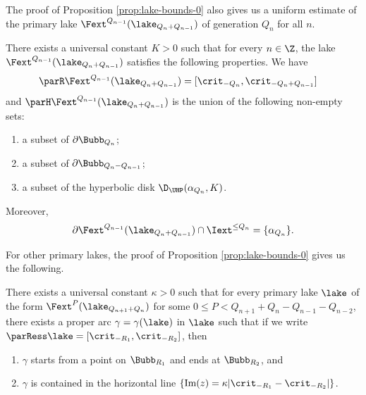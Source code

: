 \documentclass{amsart}
\begin{document}
The proof of Proposition \ref{prop:lake-bounds-0} also gives us a uniform estimate of the primary lake $\Fext^{Q_{n-1}}(\lake_{Q_n+Q_{n-1}})$ of generation $Q_n$ for all $n$.

\begin{proposition}
\label{prop:lake-bounds-1}
    There exists a universal constant $K > 0$ such that for every $n \in \Z$,
    the lake $\Fext^{Q_{n-1}}(\lake_{Q_n+Q_{n-1}})$ satisfies the following properties. 
    We have
    \begin{align*}
        \parR \Fext^{Q_{n-1}}(\lake_{Q_n+Q_{n-1}}) &= [\crit_{-Q_n}, \crit_{-Q_n+Q_{n-1}}]
    \end{align*}
    and $\parH \Fext^{Q_{n-1}}(\lake_{Q_n+Q_{n-1}})$ is the union of the following non-empty sets:
    \begin{enumerate}
        \item a subset of $\partial \Bubb_{Q_n}$;
        \item a subset of $\partial \Bubb_{Q_n-Q_{n-1}}$;
        \item a subset of the hyperbolic disk $\D_{\UHP} (\alpha_{Q_n}, K)$.
    \end{enumerate}
    Moreover,
    \[
        \partial \Fext^{Q_{n-1}}(\lake_{Q_n+Q_{n-1}}) \cap \Iext^{\leq Q_n} = \{\alpha_{Q_n}\}.
    \]
\end{proposition}
For other primary lakes, the proof of Proposition \ref{prop:lake-bounds-0} gives us the following.

\begin{proposition}
\label{prop:lake-bounds-2}
    There exists a universal constant $\kappa > 0$ such that for every primary lake $\lake$ of the form $\Fext^P(\lake_{Q_{n+1}+Q_n})$ for some $0 \leq P < Q_{n+1}+ Q_n - Q_{n-1}-Q_{n-2}$, there exists a proper arc $\gamma = \gamma(\lake)$ in $\lake$ such that if we write $\parRess \lake = [\crit_{-R_1}, \crit_{-R_2}]$, then
    \begin{enumerate}
        \item $\gamma$ starts from a point on $\Bubb_{R_1}$ and ends at $\Bubb_{R_2}$, and
        \item $\gamma$ is contained in the horizontal line $\{\textnormal{Im}(z) = \kappa |\crit_{-R_1} - \crit_{-R_2}| \}$.
    \end{enumerate}
\end{proposition}

\end{document}
